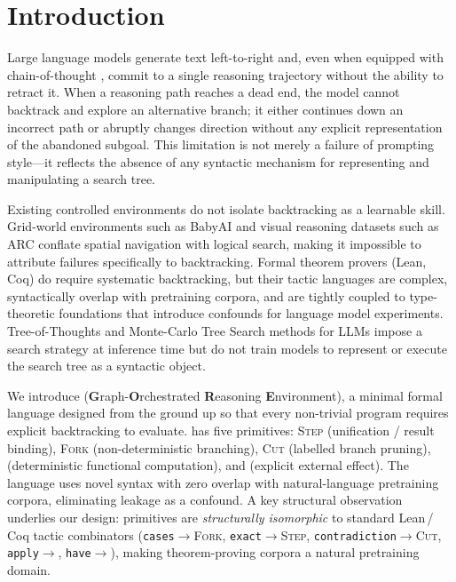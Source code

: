 \section{Introduction}
\label{sec:intro}

Large language models generate text left-to-right and, even when equipped with
chain-of-thought \citep{wei2022chain}, commit to a single reasoning trajectory
without the ability to retract it.
When a reasoning path reaches a dead end, the model cannot backtrack and
explore an alternative branch; it either continues down an incorrect path or
abruptly changes direction without any explicit representation of the abandoned
subgoal.
This limitation is not merely a failure of prompting style---it reflects the
absence of any syntactic mechanism for representing and manipulating a search
tree.

Existing controlled environments do not isolate backtracking as a learnable
skill.
Grid-world environments such as BabyAI and visual reasoning datasets such as
ARC conflate spatial navigation with logical search, making it impossible to
attribute failures specifically to backtracking.
Formal theorem provers (Lean, Coq) do require systematic backtracking, but
their tactic languages are complex, syntactically overlap with pretraining
corpora, and are tightly coupled to type-theoretic foundations that introduce
confounds for language model experiments.
Tree-of-Thoughts \citep{yao2024tree} and Monte-Carlo Tree Search methods for
LLMs impose a search strategy at inference time but do not train models to
represent or execute the search tree as a syntactic object.

We introduce \gore{} (\textbf{G}raph-\textbf{O}rchestrated \textbf{R}easoning
\textbf{E}nvironment), a minimal formal language designed from the ground up so
that every non-trivial program requires explicit backtracking to evaluate.
\gore{} has five primitives: \textsc{Step} (unification / result binding),
\textsc{Fork} (non-deterministic branching), \textsc{Cut} (labelled branch
pruning),  (deterministic functional computation), and \callstmt{}
(explicit external effect).
The language uses novel syntax with zero overlap with natural-language
pretraining corpora, eliminating leakage as a confound.
A key structural observation underlies our design: \gore{} primitives are
\emph{structurally isomorphic} to standard Lean\,/\,Coq tactic combinators
(\texttt{cases}$\to$\textsc{Fork}, \texttt{exact}$\to$\textsc{Step},
\texttt{contradiction}$\to$\textsc{Cut}, \texttt{apply}$\to$\callstmt{},
\texttt{have}$\to$), making theorem-proving corpora a natural
pretraining domain.

